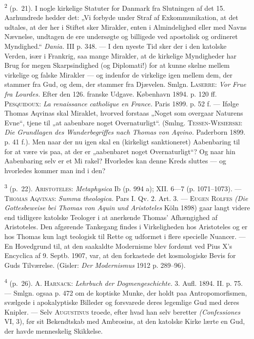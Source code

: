 \documentclass[12pt,a4paper,openany]{book}
\newcommand{\opage}[1]{\marginnote{\footnotesize\textit{[#1]}}}
\begin{document}
\begin{small}
\textsuperscript{2} (p.~21). I nogle kirkelige Statuter for Danmark fra
Slutningen af det 15.
Aarhundrede hedder det: „Vi forbyde under Straf af Exkommunikation, at
det udtales, at der her i Stiftet sker Mirakler, enten i Almindelighed
eller med Navns Nævnelse, undtagen de ere undersøgte og billigede ved
apostolisk og ordineret Myndighed.“ \textit{Dania.} III p. 348. --- I
den nyeste Tid sker der i den katolske Verden, især i Frankrig, saa
mange Mirakler, at de kirkelige Myndigheder har Brug for megen
Skarpsindighed (og Diplomati!) for at kunne skelne mellem virkelige og
falske Mirakler --- og indenfor de virkelige igen mellem dem, der
stammer fra Gud, og dem, der stammer fra Djævelen. Smlgn.
\textsc{Laserre}: \textit{Vor Frue fra Lourdes.} Efter den 126. franske
Udgave. København 1894. p. 120 ff. \textsc{Pesquidoux}: \textit{La
renaissance catholique en France.} Paris 1899. p. 52 f. --- Ifølge
Thomas Aqvinas skal Miraklet, hvorved forstaas „Noget som overgaar
Naturens Evne“, tjene til „at aabenbare noget Overnaturligt“. (Smlng.
\textsc{Tessen-Wesierski}: \textit{Die Grundlagen des Wunderbegriffes
nach Thomas von Aqvino.} Paderborn 1899. p. 41 f.). Men naar der nu igen
skal en (kirkeligt sanktioneret) Aabenbaring til for at være vis paa, at
der er „aabenbaret noget Overnaturligt“? Og naar hin Aabenbaring selv er
et Mi%
\opage{246}rakel? Hvorledes kan denne Kreds sluttes --- og hvorledes
kommer man ind i den?

\textsuperscript{3} (p.~22). \textsc{Aristoteles}: \textit{Metaphysica}
Ib (p. 994 a); XII. 6---7 (p.
1071--1073). --- \textsc{Thomas Aqvinas}: \textit{Summa theologica.}
Pars I. Qv. 2. Art. 3. --- \textsc{Eugen Rolfes} \textit{(Die
Gottesbeweise bei Thomas von Aquin und Aristoteles} Köln 1898) gaar
langt videre end tidligere katolske Teologer i at anerkende Thomas’
Afhængighed af Aristoteles. Den afgørende Tankegang findes i
Virkeligheden hos Aristoteles og er hos Thomas kun lagt teologisk til
Rette og udformet i flere specielle Nuancer. --- En Hovedgrund til, at
den saakaldte Modernisme blev fordømt ved Pius X’s Encyclica af 9.
Septb. 1907, var, at den forkastede det kosmologiske Bevis for Guds
Tilværelse. (Gisler: \textit{Der Modernismus} 1912 p. 289--96).

\textsuperscript{4} (p.~26). A. \textsc{Harnack}: \textit{Lehrbuch der
Dogmengeschichte.} 3. Aufl.
1894. II. p. 75. --- Smlgn. ogsaa p. 472 om de koptiske Munke, der holdt
paa Antropomorfismen, svælgede i apokalyptiske Billeder og forsvarede
deres legemlige Gud med deres Knipler. --- Selv \textsc{Augustinus}
troede, efter hvad han selv beretter \textit{(Confessiones} VI, 3), før
sit Bekendtskab med Ambrosius, at den katolske Kirke lærte en Gud, der
havde menneskelig Skikkelse.


\end{small}
\end{document}
